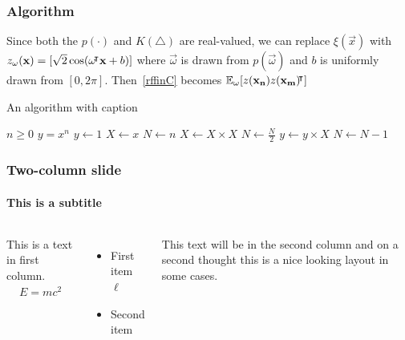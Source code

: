 \documentclass[10pt]{../formats/RU}
\begin{document}
\begin{frame}
  \frametitle{Algorithm}
  Since both the $p(\cdot)$ and $K(\triangle)$ are real-valued, we can replace $\xi(\vec{x})$ with $z_{\mathbf{\omega}}(\mathbf{x})=[\sqrt{2}\cos(\mathbf{\omega}{}^{\mkern-4mu\intercal}\mathbf{x}+b)]$ where $\vec{\omega}$ is drawn from $p(\vec{\omega})$ and $b$ is uniformly drawn from $[0, 2\pi]$. Then~\eqref{rffinC} becomes $\mathbb{E}_{\mathbf{\omega}}[z(\mathbf{x_n})z(\mathbf{x_m}){}^{\mkern-4mu\intercal}]$
  \begin{algorithm}[H]
    \caption{An algorithm with caption}\label{alg:cap}
    \begin{algorithmic}[1]
    \Require $n \geq 0$
    \Ensure $y = x^n$
    \State $y \gets 1$
    \State $X \gets x$
    \State $N \gets n$
        \State $X \gets X \times X$
        \State $N \gets \frac{N}{2}$  
        \State $y \gets y \times X$
        \State $N \gets N - 1$
    \EndIf
    \EndWhile
    \end{algorithmic}
  \end{algorithm}
\end{frame}


\begin{frame}
\frametitle{Two-column slide}
\framesubtitle{This is a subtitle}

\begin{columns}

This is a text in first column.
\begin{align*}
  E=mc^2
\end{align*}
\begin{itemize}
\item First item $\ell$
\item Second item
\end{itemize}

This text will be in the second column
and on a second thought this is a nice looking
layout in some cases.
\end{columns}
\end{frame}
\end{document}
